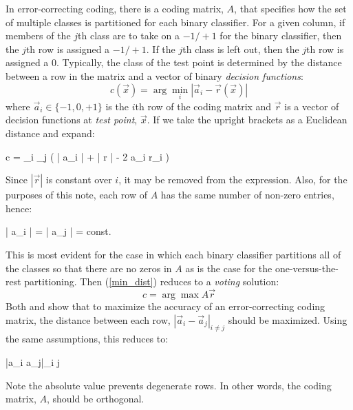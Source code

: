 In error-correcting coding, there is a coding matrix, $A$, that specifies
how the set of multiple classes is partitioned for each binary classifier.
For a given column, 
if members of the $j$th class are to take on a $-1/+1$ for the
binary classifier, then the $j$th row is assigned a $-1/+1$.
If the $j$th class is left out, then the $j$th row is assigned a $0$.
Typically, the class of the test point is determined by the distance between
a row in the matrix and a vector of binary {\it decision functions}:
\begin{equation}
	c(\vec x) = \arg \min_i | \vec a_i - \vec r(\vec x) |
	\label{min_dist}
\end{equation}
where $\vec a_i\in \lbrace -1,0,+1 \rbrace$ 
is the $i$th row of the coding matrix and 
$\vec r$ is a vector of decision functions at {\it test point}, $\vec x$.
If we take the upright brackets as a Euclidean distance and expand:
\begin{eqnnon}
	c = \arg \min_i \sum_j \left ( | \vec a_i | + | \vec r | - 2 \vec a_i  \cdot \vec r_i  \right ) 
\end{eqnnon}
Since $| \vec r |$ is constant over $i$, it may be removed from the expression.
Also, for the purposes of this note,
each row of $A$ has the same number of non-zero entries, hence:
\begin{eqnnon}
	| \vec a_i | = | \vec a_j | = const.
\end{eqnnon}
This is most evident for the case in which each binary classifier partitions
all of the classes so that there are no zeros in $A$
as is the case for the one-versus-the-rest partitioning.
Then (\ref{min_dist}) reduces to a {\it voting} solution:
\begin{equation}
	c = \arg \max A \vec r \label{voting}
\end{equation}
Both \citet{Allwein_etal2000} and \citet{Windeatt_Ghaderi2002} show that to
maximize the accuracy of an error-correcting coding matrix, the distance
between each row, $|\vec a_i - \vec a_j|_{i \ne j}$ should be maximized.
Using the same assumptions, this reduces to:
\begin{eqnnon}
	\min |\vec a_i \cdot \vec a_j|_{i \ne j}
\end{eqnnon}
Note the absolute value prevents degenerate rows.
In other words, the coding matrix, $A$, should be orthogonal.

